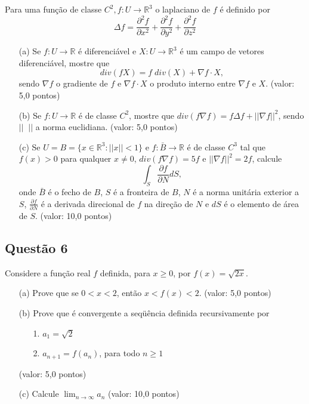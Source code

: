 Para uma fun\c c\~ao de classe $C^2, f: U \to \mathbb R^3$ o laplaciano de $f$ \'e definido por $$\Delta f = \frac{\partial^2 f}{\partial x^2}+\frac{\partial^2 f}{\partial y^2}+\frac{\partial^2 f}{\partial z^2}$$

\begin{enumerate}

\item[(a)] Se $f: U \to \mathbb R$ \'e diferenci\'avel e $X: U \to \mathbb R^3$ \'e um campo de vetores diferenci\'avel, mostre que $$div(f X)=f\; div(X) + \nabla f \cdot X ,$$ sendo $\nabla f$ o gradiente de $f$ e $\nabla f \cdot X$ o produto interno entre $\nabla f$ e $X$. (valor: 5,0 pontos)

\item[(b)] Se $f: U \to \mathbb R$ \'e de classe $C^2$, mostre que $div(f\nabla f) = f \Delta f + || \nabla f ||^2$, sendo $||\;\;||$ a norma euclidiana. (valor: 5,0 pontos)

\item[(c)] Se $U = B = \{x \in \mathbb R^3: || x || < 1\}$ e $f: \bar B \to \mathbb R$ \'e de classe $C^3$ tal que $f(x) > 0$ para qualquer $x \neq 0$, $div(f \nabla f) = 5f$ e $|| \nabla f ||^2= 2f$, calcule $$ \int_S \frac{\partial f}{\partial N} dS ,$$ onde $\bar B$ \'e o fecho de $B$, $S$ \'e a fronteira de $B$, $N$ \'e a norma unit\'aria exterior a $S$, $\displaystyle \frac{\partial f}{\partial N}$ \'e a derivada direcional de $f$ na dire\c c\~ao de $N$ e $dS$ \'e o elemento de \'area de $S$. (valor: 10,0 pontos)

\end{enumerate}

\subsection{\color{blue} Quest\~ao 6}

Considere a fun\c c\~ao real $f$ definida, para $x \geq 0$, por $f(x) = \sqrt{2x}$.

\begin{enumerate}

\item[(a)] Prove que se $0 < x < 2$, ent\~ao $x < f(x) < 2$. (valor: 5,0 pontos)

\item[(b)] Prove que \'e convergente a seqü\^encia definida recursivamente por

\begin{enumerate}

\item[1.] $a_1=\sqrt 2$

\item[2.] $a_{n+1}=f(a_n)$, para todo $n \geq 1$

\end{enumerate}

(valor: 5,0 pontos)

\item[(c)] Calcule $\displaystyle \lim_{n \to \infty} a_n$ (valor: 10,0 pontos)

\end{enumerate}

